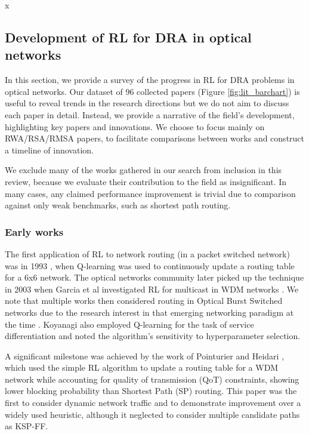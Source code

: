 x\subsection{Development of RL for DRA in optical networks}
\label{sec:survey-development}

In this section, we provide a survey of the progress in RL for DRA problems in optical networks. Our dataset of 96 collected papers (Figure \ref{fig:lit_barchart}) is useful to reveal trends in the research directions but we do not aim to discuss each paper in detail. Instead, we provide a narrative of the field's development, highlighting key papers and innovations. We choose to focus mainly on RWA/RSA/RMSA papers, to facilitate comparisons between works and construct a timeline of innovation.

We exclude many of the works gathered in our search from inclusion in this review, because we evaluate their contribution to the field as insignificant. In many cases, any claimed performance improvement is trivial due to comparison against only weak benchmarks, such as shortest path routing. %




\subsubsection{Early works}
The first application of RL to network routing (in a packet switched network) was in 1993 \cite{boyan_packet_1993}, when Q-learning was used to continuously update a routing table for a 6x6 network. The optical networks community later picked up the technique in 2003 when Garcia et al investigated RL for multicast in WDM networks \cite{garcia_multicast_2003}. We note that multiple works then considered routing in Optical Burst Switched networks due to the research interest in that emerging networking paradigm at the time \cite{kiran_reinforcement_2006,belbekkouche_reinforcement_2008}. Koyanagi also \cite{koyanagi_reinforcement_2009} employed Q-learning for the task of service differentiation and noted the algorithm's sensitivity to hyperparameter selection. 

A significant milestone was achieved by the work of Pointurier and Heidari \cite{pointurier_reinforcement_2007}, which used the simple RL algorithm to update a routing table for a WDM network while accounting for quality of transmission (QoT) constraints, showing lower blocking probability than Shortest Path (SP) routing. This paper was the first to consider dynamic network traffic and to demonstrate improvement over a widely used heuristic, although it neglected to consider multiple candidate paths as KSP-FF. 

